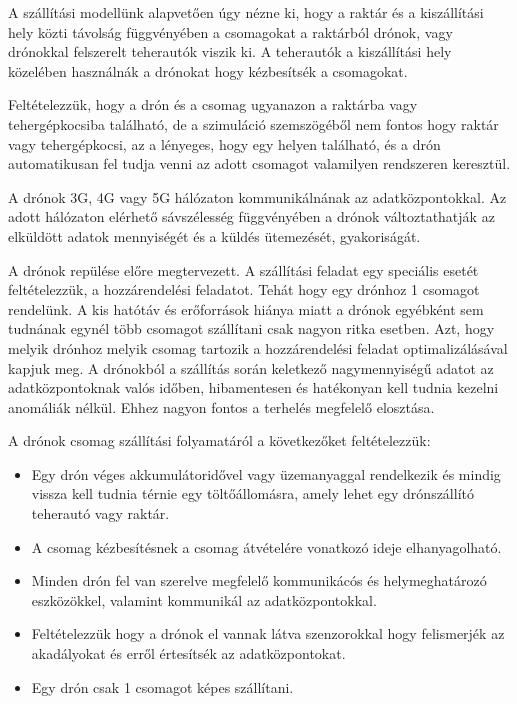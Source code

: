 
A szállítási modellünk alapvetően úgy nézne ki, hogy a raktár és a kiszállítási hely közti távolság függvényében a csomagokat a raktárból drónok, vagy drónokkal felszerelt teherautók viszik ki.
A teherautók a kiszállítási hely közelében használnák a drónokat hogy kézbesítsék a csomagokat.

Feltételezzük, hogy a drón és a csomag ugyanazon a raktárba vagy tehergépkocsiba található, de a szimuláció szemszögéből nem fontos hogy raktár vagy tehergépkocsi, az a lényeges, hogy egy helyen található, és a drón automatikusan fel tudja venni az adott csomagot
valamilyen rendszeren keresztül.

A drónok 3G, 4G vagy 5G hálózaton kommunikálnának az adatközpontokkal.
Az adott hálózaton elérhető sávszélesség függvényében a drónok változtathatják az elküldött adatok mennyiségét és a küldés ütemezését, gyakoriságát.

A drónok repülése előre megtervezett. A szállítási feladat egy speciális esetét feltételezzük, a hozzárendelési feladatot.
Tehát hogy egy drónhoz 1 csomagot rendelünk. A kis hatótáv és erőforrások hiánya miatt a drónok egyébként sem tudnának egynél több csomagot szállítani csak nagyon ritka esetben.
Azt, hogy melyik drónhoz melyik csomag tartozik a hozzárendelési feladat optimalizálásával kapjuk meg.
A drónokból a szállítás során keletkező nagymennyiségű adatot az adatközpontoknak valós időben, hibamentesen
és hatékonyan kell tudnia kezelni anomáliák nélkül.
Ehhez nagyon fontos a terhelés megfelelő elosztása.

A drónok csomag szállítási folyamatáról a következőket feltételezzük:
\begin{itemize}
    \item Egy drón  véges akkumulátoridővel vagy üzemanyaggal rendelkezik és mindig vissza kell tudnia térnie egy töltőállomásra, amely lehet egy drónszállító teherautó vagy raktár.
    \item A csomag kézbesítésnek a csomag átvételére vonatkozó ideje elhanyagolható.
    \item Minden drón fel van szerelve megfelelő kommunikácós és helymeghatározó eszközökkel, valamint kommunikál az adatközpontokkal.
    \item Feltételezzük hogy a drónok el vannak látva szenzorokkal hogy felismerjék az akadályokat és erről értesítsék az adatközpontokat.
    \item Egy drón csak 1 csomagot képes szállítani.
\end{itemize}

